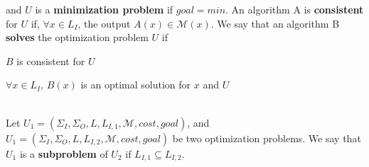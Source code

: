 \begin{tabu}
{   and $U$ is a {\bf minimization problem} if $goal = min$. \newline
   An algorithm A is {\bf consistent} for $U$ if, $\forall x \in L_I$, the
   output $A(x) \in \mathcal{M}(x)$. We say that an algorithm B {\bf solves} the
   optimization problem $U$ if
   \begin{enumeratex}
   \item $B$ is consistent for $U$
   \item $\forall x \in L_I$, $B(x)$ is an optimal solution for $x$ and $U$
   \end{enumeratex}} \\ \hline
 {Let $U_1 = (\Sigma_I, \Sigma_O, L, L_{I,1}, \mathcal{M}, cost,
 goal)$, and $ U_1 = (\Sigma_I, \Sigma_O, L, L_{I,2}, \mathcal{M}, cost, goal)$
 be two optimization problems. We say that $U_1$ is a {\bf subproblem} of $U_2$
 if $L_{I,1} \subseteq L_{I,2}$.}
\end{tabu}
